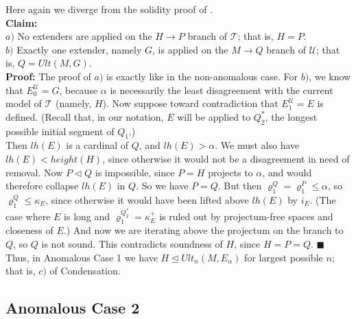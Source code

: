 \documentclass[12pt]{article}
\begin{document}
Here again we diverge from the solidity proof of \cite{FSPIPM}.\\

\textbf{Claim:}\\

\indent \indent $a)$ No extenders are applied on the $H \longrightarrow P$ branch of $\mathscr{T}$; that is, $H = P$.\\

\indent \indent $b)$ Exactly one extender, namely $G$, is applied on the $M \longrightarrow Q$ branch of $\mathscr{U}$; that is, $Q = Ult(M , G)$.\\

\indent \indent \textbf{Proof:} The proof of $a)$ is exactly like in the non-anomalous case.  For $b)$, we know that $E_0^{\mathscr{U}} = G$, because $\alpha$ is necessarily the least disagreement with the current model of $\mathscr{T}$ (namely, $H$).  Now suppose toward contradiction that $E_1^{\mathscr{U}} = E$ is defined.  (Recall that, in our notation, $E$ will be applied to $Q_2^*$, the longest possible initial segment of $Q_1$.)\\

 Then $lh(E)$ is a cardinal of $Q$, and $lh(E) > \alpha$.  We must also have $lh(E) < height(H)$, since otherwise it would not be a disagreement in need of removal.  Now $P \lhd Q$ is impossible, since $P = H$ projects to $\alpha$, and would therefore collapse $lh(E)$ in $Q$.  So we have $P = Q$.  But then $\varrho_1^Q = \varrho_1^P \leq \alpha$, so $\varrho_1^Q \leq \kappa_E$, since otherwise it would have been lifted above $lh(E)$ by $i_E$.  (The case where $E$ is long and $\varrho_1^{Q_2^*} = \kappa_E^+$ is ruled out by projectum-free spaces and closeness of $E$.)  And now we are iterating above the projectum on the branch to $Q$, so $Q$ is not sound.  This contradicts soundness of $H$, since $H = P = Q$. $\blacksquare$\\

Thus, in Anomalous Case 1 we have $H \unlhd Ult_n(M, E_\alpha)$ for largest possible $n$; that is, $c)$ of Condensation.\\








\subsection{Anomalous Case 2} \label{AC2 subsection}
\end{document}
